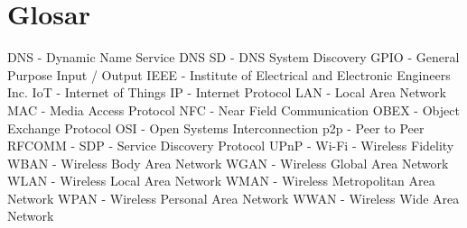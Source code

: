 \documentclass[12pt,a4paper]{article}
\begin{document}
    \section{Glosar}
        DNS - Dynamic Name Service
        DNS SD - DNS System Discovery
        GPIO - General Purpose Input / Output
        IEEE - Institute of Electrical and Electronic Engineers Inc.
        IoT - Internet of Things
        IP - Internet Protocol
        LAN - Local Area Network
        MAC - Media Access Protocol
        NFC - Near Field Communication
        OBEX - Object Exchange Protocol
        OSI - Open Systems Interconnection
        p2p - Peer to Peer
        RFCOMM - 
        SDP - Service Discovery Protocol
        UPnP - 
        Wi-Fi - Wireless Fidelity
        WBAN - Wireless Body Area Network
        WGAN - Wireless Global Area Network
        WLAN - Wireless Local Area Network
        WMAN - Wireless Metropolitan Area Network
        WPAN - Wireless Personal Area Network
        WWAN - Wireless Wide Area Network
\end{document}
